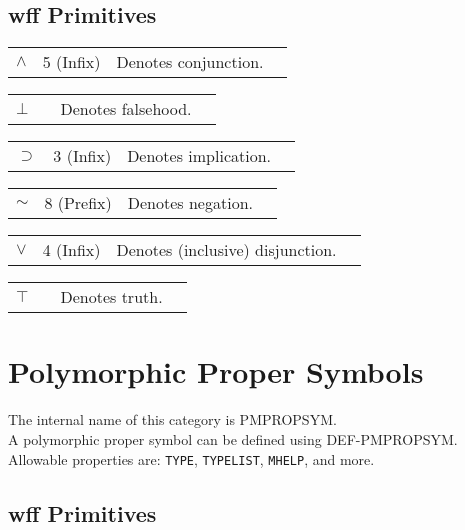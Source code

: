 \section{wff Primitives}

\begin{description} 
\item[AND]  \begin{tabular}{l l l l}
\texttt{$\land$}&5 (Infix)&
Denotes conjunction.
\end{tabular}

\item[FALSEHOOD]  \begin{tabular}{l l l l}
\texttt{$\bot$}&&
Denotes falsehood.
\end{tabular}

\item[IMPLIES]  \begin{tabular}{l l l l}
\texttt{$\supset$}&3 (Infix)&
Denotes implication.
\end{tabular}

\item[NOT]  \begin{tabular}{l l l l}
\texttt{$\sim$}&8 (Prefix)&
Denotes negation.
\end{tabular}

\item[OR]  \begin{tabular}{l l l l}
\texttt{$\lor$}&4 (Infix)&
Denotes (inclusive) disjunction.
\end{tabular}

\item[TRUTH]  \begin{tabular}{l l l l}
\texttt{$\top$}&&
Denotes truth.
\end{tabular}
\item
\end{description}
\chapter{Polymorphic Proper Symbols}
The internal name of this category is 
PMPROPSYM.\\
A polymorphic proper symbol can be defined using DEF-PMPROPSYM.
Allowable properties are: \texttt{TYPE}, \texttt{TYPELIST}, \texttt{MHELP}, and more.

\section{wff Primitives}

